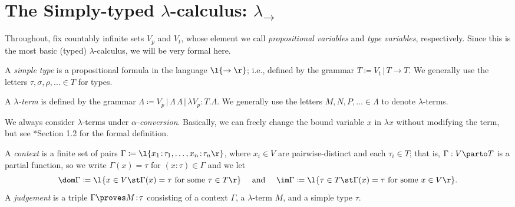 \documentclass[reqno]{amsart}
\begin{document}
    \section{The Simply-typed $\lambda$-calculus: $\lambda_\rightarrow$}

    Throughout, fix countably infinite sets $V_p$ and $V_t$, whose element we call \textit{propositional variables} and \textit{type variables}, respectively. Since this is the most basic (typed) $\lambda$-calculus, we will be very formal here.

    \begin{definition}
        A \textit{simple type} is a propositional formula in the language $\l\{\rightarrow\r\}$; i.e., defined by the grammar $T\coloneqq V_t\,|\,T\rightarrow T$. We generally use the letters $\tau,\sigma,\rho,\ldots\in T$ for types.
    \end{definition}

    \begin{definition}
        A \textit{$\lambda$-term} is defined by the grammar $\Lambda\coloneqq V_p\,|\,\Lambda\,\Lambda\,|\,\lambda V_p\!:\!T.\Lambda$. We generally use the letters $M,N,P,\ldots\in\Lambda$ to denote $\lambda$-terms.
    \end{definition}

    \begin{remark}
        We always consider $\lambda$-terms under \textit{$\alpha$-conversion}. Basically, we can freely change the bound variable $x$ in $\lambda x$ without modifying the term, but see \cite{SU06}*{Section 1.2} for the formal definition.
    \end{remark}

    \begin{definition}
        A \textit{context} is a finite set of pairs $\Gamma\coloneqq\l\{x_1\!:\!\tau_1,\dots,x_n\!:\!\tau_n\r\}$, where $x_i\in V$ are pairwise-distinct and each $\tau_i\in T$; that is, $\Gamma:V\parto T$ is a partial function, so we write $\Gamma(x)=\tau$ for $(x\!:\!\tau)\in\Gamma$ and we let
        \begin{equation*}
            \dom\Gamma\coloneqq\l\{x\in V\st\Gamma(x)=\tau\textrm{ for some }\tau\in T\r\}\ \ \ \ \textrm{and}\ \ \ \ \im\Gamma\coloneqq\l\{\tau\in T\st\Gamma(x)=\tau\textrm{ for some }x\in V\r\}.
        \end{equation*}
        A \textit{judgement} is a triple $\Gamma\proves M\!:\!\tau$ consisting of a context $\Gamma$, a $\lambda$-term $M$, and a simple type $\tau$.
    \end{definition}
\end{document}
